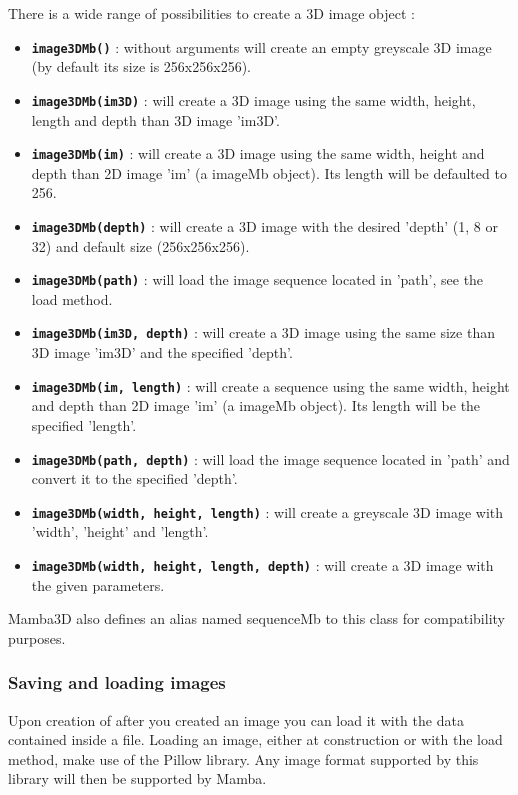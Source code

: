 \documentclass[a4paper,10pt,oneside]{article}
\begin{document}
There is a wide range of possibilities to create a 3D image object :
\begin{itemize}
\item \texttt{\textbf{image3DMb()}} : without arguments will create an empty
greyscale 3D image (by default its size is 256x256x256).
\item \texttt{\textbf{image3DMb(im3D)}} : will create a 3D image using the
same width, height, length and depth than 3D image 'im3D'.
\item \texttt{\textbf{image3DMb(im)}} : will create a 3D image using the same
width, height and depth than 2D image 'im' (a imageMb object). Its
length will be defaulted to 256.
\item \texttt{\textbf{image3DMb(depth)}} : will create a 3D image with the
desired 'depth' (1, 8 or 32) and default size (256x256x256).
\item \texttt{\textbf{image3DMb(path)}} : will load the image sequence located
in 'path', see the load method.
\item \texttt{\textbf{image3DMb(im3D, depth)}} : will create a 3D image using
the same size than 3D image 'im3D' and the specified 'depth'.
\item \texttt{\textbf{image3DMb(im, length)}} : will create a sequence using
the same width, height and depth than 2D image 'im' (a imageMb object). Its
length will be the specified 'length'.
\item \texttt{\textbf{image3DMb(path, depth)}} : will load the image sequence
located in 'path' and convert it to the specified 'depth'.
\item \texttt{\textbf{image3DMb(width, height, length)}} : will create a 
greyscale 3D image with 'width', 'height' and 'length'.
\item \texttt{\textbf{image3DMb(width, height, length, depth)}} : will create
a 3D image with the given parameters.
\end{itemize}

Mamba3D also defines an alias named sequenceMb to this class for compatibility
purposes.

\subsubsection{Saving and loading images}

Upon creation of after you created an image you can load it with the data
contained inside a file. Loading an image, either at construction or
with the load method, make use of the Pillow library. Any image format supported
by this library will then be supported by Mamba.
\end{document}
